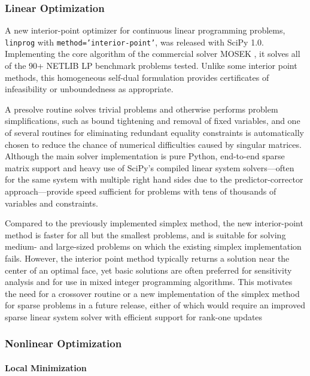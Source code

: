 \subsubsection*{Linear Optimization}

A new interior-point optimizer for continuous linear programming problems, \texttt{linprog} with \texttt{method='interior-point'}, was released with SciPy 1.0. Implementing the core algorithm of the commercial solver MOSEK \cite{andersen2000mosek}, it solves all of the 90+ NETLIB LP benchmark problems \cite{netlib} tested. Unlike some interior point methods, this homogeneous self-dual formulation provides certificates of infeasibility or unboundedness as appropriate. 

A presolve routine \cite{andersen1995presolving} solves trivial problems and otherwise performs problem simplifications, such as bound tightening and removal of fixed variables, and one of several routines for eliminating redundant equality constraints is automatically chosen to reduce the chance of numerical difficulties caused by singular matrices. Although the main solver implementation is pure Python, end-to-end sparse matrix support and heavy use of SciPy's compiled linear system solvers---often for the same system with multiple right hand sides due to the predictor-corrector approach---provide speed sufficient for problems with tens of thousands of variables and constraints.

Compared to the previously implemented simplex method, the new interior-point method is faster for all but the smallest problems, and is suitable for solving medium- and large-sized problems on which the existing simplex implementation fails. However, the interior point method typically returns a solution near the center of an optimal face, yet basic solutions are often preferred for sensitivity analysis and for use in mixed integer programming algorithms. This motivates the need for a crossover routine or a new implementation of the simplex method for sparse problems in a future release, either of which would require an improved sparse linear system solver with efficient support for rank-one updates

\subsubsection*{Nonlinear Optimization}
\paragraph{Local Minimization}

